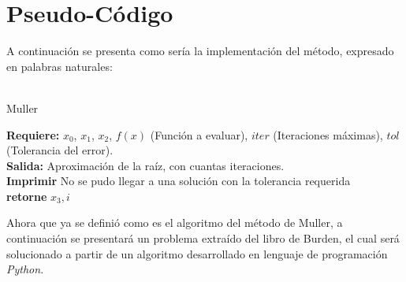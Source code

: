 \documentclass[ceqn,10pt]{SelfArx}
\begin{document}
\section{Pseudo-Código}
A continuación se presenta como sería la implementación del método,
expresado en palabras naturales:\\\
\begin{algorithm}[H] %
 \caption{Muller}
 \textbf{Requiere:} $x_{0}$, $x_{1}$, $x_{2}$, $f(x)$ (Función a evaluar), $iter$ (Iteraciones máximas), $tol$ (Tolerancia del error).\\
 \textbf{Salida:} Aproximación de la raíz, con cuantas iteraciones.\\
     \SetAlgoLined
     \textbf{Imprimir } No se pudo llegar a una solución con la tolerancia requerida\\
     \textbf{retorne} $x_{3},i$\\
\end{algorithm}
Ahora que ya se definió como es el algoritmo del método de Muller, a
continuación se presentará un problema extraído del libro de Burden, el
cual será solucionado a partir de un algoritmo desarrollado en lenguaje de
programación \emph{Python}.
\end{document}
